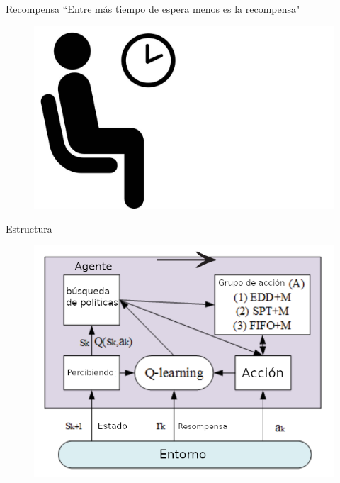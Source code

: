 \documentclass{beamer}
\begin{document}
\begin{frame}{Recompensa}
	``Entre más tiempo de espera menos es la recompensa"
	\begin{figure}
	\centering
	\includegraphics[scale=0.15]{tiempodeespera}
	\end{figure} 
\end{frame}

\begin{frame}{Estructura}
	\begin{figure}
		\centering
		\includegraphics[scale=0.4]{estructura}
	\end{figure} 
\end{frame}
\end{document}
